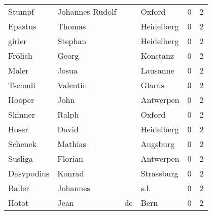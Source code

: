 \begin{tabular}{llllrr}
                   Stumpf &                    Johannes Rudolf &             &                                      Oxford &          0 &         2 \\
                  Epastus &                             Thomas &             &                                  Heidelberg &          0 &         2 \\
                   girier &                            Stephan &             &                                  Heidelberg &          0 &         2 \\
                  Frölich &                              Georg &             &                                    Konstanz &          0 &         2 \\
                    Maler &                              Josua &             &                                    Lausanne &          0 &         2 \\
                  Tschudi &                           Valentin &             &                                      Glarus &          0 &         2 \\
                   Hooper &                               John &             &                                   Antwerpen &          0 &         2 \\
                  Skinner &                              Ralph &             &                                      Oxford &          0 &         2 \\
                    Hoser &                              David &             &                                  Heidelberg &          0 &         2 \\
                  Schenek &                            Mathias &             &                                    Augsburg &          0 &         2 \\
                  Susliga &                            Florian &             &                                   Antwerpen &          0 &         2 \\
               Dasypodius &                             Konrad &             &                                  Strassburg &          0 &         2 \\
                   Baller &                           Johannes &             &                                        s.l. &          0 &         2 \\
                    Hotot &                               Jean &          de &                                        Bern &          0 &         2 \\

\end{tabular}
